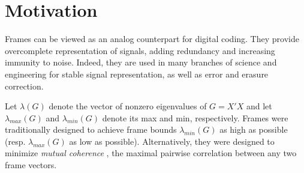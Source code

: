 \documentclass[a4paper,12pt]{article}
\newcommand{\comm}[1]{ {\tt \color{blue} [Comment:#1] } }
\newcommand{\E}{\ensuremath{\mathbb{E}}}
\newcommand{\specstat}{\ensuremath{\Psi}}
\begin{document}
%







\section*{Motivation} \label{sec:motivation} 

Frames can be viewed as an analog counterpart for digital coding. They provide 
overcomplete representation of signals, adding redundancy and increasing
immunity to noise. 
Indeed, they are used in
many branches of science and engineering for stable signal representation,
as well as error and erasure correction.

Let $\lambda(G)$ denote the vector of nonzero eigenvalues of $G=X'X$ and let 
$\lambda_{max}(G)$ and $\lambda_{min}(G)$ denote its max and min,
respectively. 
Frames were traditionally designed to achieve frame bounds  $\lambda_{min}(G)$
as high as possible (resp. $\lambda_{max}(G)$ as low as possible).
Alternatively, they were designed to
minimize  {\em mutual coherence} \cite{Donoho-stable,Elad2010},
the maximal pairwise correlation between any two frame vectors.
\end{document}
